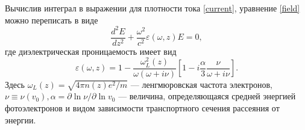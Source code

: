\documentclass[12pt,a4paper]{article}
\numberwithin{equation}{section}
\begin{document}
Вычислив интеграл в выражении для плотности тока \eqref{current}, уравнение \eqref{field} можно переписать в виде
\begin{equation}
    \label{field2}
    \frac{d^2E}{dz^2}+\frac{\omega^2}{c^2}\varepsilon\left(\omega, z\right)E = 0,
\end{equation}
где диэлектрическая проницаемость имеет вид
\begin{equation}
    \label{perm_fin}
    \varepsilon(\omega, z)=1-\frac{\omega_L^2\left(z\right)}{\omega\left(\omega+i\nu\right) }\left[1-i\frac{\alpha}{3}\frac{\nu}{\omega+i\nu}\right].
\end{equation}
Здесь $\omega_L\left(z\right) = \sqrt{4\pi n\left(z\right)e^2/m}$ — ленгмюровская частота электронов, $\nu\equiv\nu\left(v_0\right),\alpha=\partial \ln\nu/\partial \ln v_0%
$ — величина, определяющаяся средней энергией фотоэлектронов и видом зависимости транспортного сечения рассеяния от энергии. %
\end{document}
